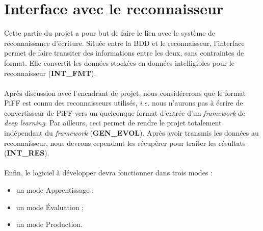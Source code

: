 \section{Interface avec le reconnaisseur}

Cette partie du projet a pour but de faire le lien avec le système de
reconnaissance d’écriture. Située entre la BDD et le reconnaisseur,
l’interface permet de faire transiter des informations entre les deux, sans
contraintes de format. Elle convertit les données stockées en données
intelligibles pour le reconnaisseur (\textbf{INT\_FMT}).

\paragraph{}
Après discussion avec l'encadrant de projet, nous considérerons que le format
PiFF est connu des reconnaisseurs utilisés, \textit{i.e.} nous n'aurons pas à
écrire de convertisseur de PiFF vers un quelconque format d'entrée d'un
\textit{framework} de \textit{deep learning}. Par ailleurs, ceci permet de
rendre le projet totalement indépendant du \textit{framework}
(\textbf{GEN\_EVOL}). Après avoir transmis les données au reconnaisseur, nous
devrons cependant les récupérer pour traiter les résultats (\textbf{INT\_RES}).

\paragraph{}
Enfin, le logiciel à développer devra fonctionner dans trois modes :
\begin{itemize}
\item un mode Apprentissage ;
\item un mode Évaluation ;
\item un mode Production.
\end{itemize}